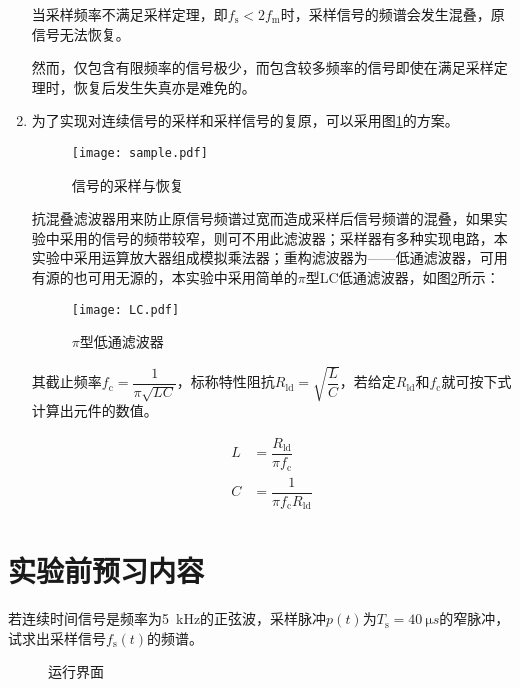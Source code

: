 \begin{enumerate}
		当采样频率不满足采样定理，即$ f_\text{s}<2f_\text{m} $时，采样信号的频谱会发生混叠，原信号无法恢复。

		然而，仅包含有限频率的信号极少，而包含较多频率的信号即使在满足采样定理时，恢复后发生失真亦是难免的。
	\item 为了实现对连续信号的采样和采样信号的复原，可以采用图\ref{fig:信号的采样与恢复}的方案。

		\begin{figure}[htpb]
			\centering
			\texttt{[image: sample.pdf]}
			\caption{信号的采样与恢复}
			\label{fig:信号的采样与恢复}
		\end{figure}

		抗混叠滤波器用来防止原信号频谱过宽而造成采样后信号频谱的混叠，如果实验中采用的信号的频带较窄，则可不用此滤波器；采样器有多种实现电路，本实验中采用运算放大器组成模拟乘法器；重构滤波器为——低通滤波器，可用有源的也可用无源的，本实验中采用简单的$ \pi $型LC低通滤波器，如图\ref{fig:pi 型低通滤波器}所示：

		\begin{figure}[htpb]
			\centering
			\texttt{[image: LC.pdf]}
			\caption{$ \pi $型低通滤波器}
			\label{fig:pi 型低通滤波器}
		\end{figure}

		其截止频率$ f_\text{c}=\dfrac{1}{\pi\sqrt{LC}} $，标称特性阻抗$ R_\text{ld}=\sqrt{\dfrac{L}{C}} $，若给定$ R_\text{ld} $和$ f_\text{c} $就可按下式计算出元件的数值。

		\begin{align}
			L&=\dfrac{R_\text{ld}}{\pi f_\text{c}}\\
			C&=\dfrac{1}{\pi f_\text{c}R_\text{ld}}
		\end{align}

\end{enumerate}

\section{实验前预习内容}%
\label{sec:实验前预习内容\arabic{chapter}}

\begin{Exercise}
	若连续时间信号是频率为\SI{5}{kHz}的正弦波，采样脉冲$ p(t) $为$ T_\text{s}=\SI{40}{\micro s} $的窄脉冲，试求出采样信号$ f_\text{s}(t) $的频谱。
\end{Exercise}


\begin{figure}[htpb]
	\centering
	\caption{运行界面}
	\label{fig:运行界面code431.m}
\end{figure}

